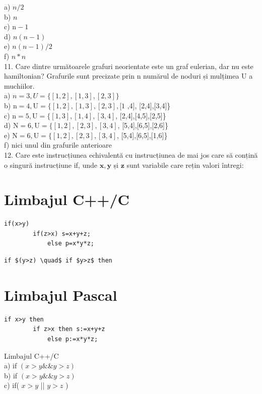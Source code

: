\documentclass[10pt]{article}
\begin{document}
a) $n / 2$\\
b) $n$\\
c) $\mathrm{n}-1$\\
d) $n(n-1)$\\
e) $n(n-1) / 2$\\
f) $n * n$\\
11. Care dintre următoarele grafuri neorientate este un graf eulerian, dar nu este hamiltonian? Grafurile sunt precizate prin n numărul de noduri și mulțimea U a muchiilor.\\
a) $n=3, U=\{[1,2],[1,3],[2,3]\}$\\
b) $\mathrm{n}=4, \mathrm{U}=\{[1,2],[1,3],[2,3],[1$ ,4], [2,4],[3,4]\}\\
c) $\mathrm{n}=5, \mathrm{U}=\{[1,3],[1,4],[3,4]$, [2,4],[4,5],[2,5]\}\\
d) $\mathrm{N}=6, \mathrm{U}=\{[1,2],[2,3],[3,4]$, [5,4],[6,5],[2,6]\}\\
e) $\mathrm{N}=6, \mathrm{U}=\{[1,2],[2,3],[3,4]$, [5,4],[6,5],[1,6]\}\\
f) nici unul din grafurile anterioare\\
12. Care este instrucțiunea echivalentă cu instrucțiunea de mai jos care să conțină o singură instrucțiune if, unde $\mathbf{x}, \mathbf{y}$ și $\mathbf{z}$ sunt variabile care rețin valori întregi:

\section*{Limbajul C++/C}
\begin{verbatim}
if(x>y)
        if(z>x) s=x+y+z;
            else p=x*y*z;
\end{verbatim}

\begin{verbatim}
if $(y>z) \quad$ if $y>z$ then
\end{verbatim}

\section*{Limbajul Pascal}
\begin{verbatim}
if x>y then
        if z>x then s:=x+y+z
            else p:=x*y*z;
\end{verbatim}

Limbajul C++/C\\
a) if $(x>y \& \& y>z)$\\
b) if $(x>y \& \& y>z)$\\
c) if( $x>y$ || $y>z$ )
\end{document}
